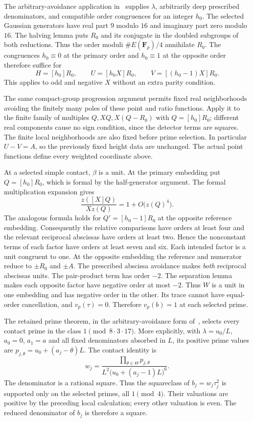 \documentclass[11pt,a4paper]{article}
\begin{document}
The arbitrary-avoidance application in~\cite[Section~2]{Primes}
supplies $\lambda$, arbitrarily deep prescribed denominators, and
compatible order congruences for an integer $h_0$.
The selected Gaussian generators have real part $9$ modulo $16$
and imaginary part zero modulo $16$. The halving lemma
\cite[Section~5]{Half} puts $R_0$ and its conjugate in the doubled
subgroups of both reductions. Thus the order moduli
$\#E(\mathbf F_p)/4$ annihilate $R_0$.
The congruences $h_0\equiv0$ at the primary order and
$h_0\equiv1$ at the opposite order therefore suffice for
\[
 H=[h_0]R_0,\qquad U=[h_0X]R_0,\qquad
 V=[(h_0-1)X]R_0.
\]
This applies to odd and negative $X$ without an extra parity condition.

The same compact-group progression argument permits fixed real
neighborhoods avoiding the finitely many poles of these point and
ratio functions. Apply it to the finite family of multiples
$Q,XQ,X(Q-R_0)$ with $Q=[h_0]R_0$; different real components cause
no sign condition, since the detector terms are squares.
The finite local neighborhoods are also fixed before prime selection.
In particular $U-V=A$, so the previously fixed height data are unchanged.
The actual point functions define every weighted coordinate above.

At a selected simple contact, $\beta$ is a unit. At the primary
embedding put $Q=[h_0]R_0$, which is formal by the half-generator
argument. The formal multiplication expansion gives
\[
             \frac{z([X]Q)}{X z(Q)}
                         =1+O\bigl(z(Q)^4\bigr).
\]
The analogous formula holds for $Q'=[h_0-1]R_0$ at the opposite
reference embedding. Consequently the relative comparisons have
orders at least four and the relevant reciprocal abscissas have
orders at least two.
Hence the nonconstant terms of each factor have orders at least
seven and six. Each intended factor is a unit congruent to one.
At the opposite embedding the reference and numerator reduce to
$\pm R_0$ and $\pm A$. The prescribed abscissa avoidance makes
\emph{both} reciprocal abscissas units. The pair-product term has
order $-2$. The separation lemma makes each opposite factor have
negative order at most $-2$. Thus $W$ is a unit in one embedding
and has negative order in the other. Its trace cannot have
equal-order cancellation, and $v_p(\tau)=0$.
Therefore $v_p(b)=1$ at each selected prime.

The retained prime theorem, in the arbitrary-avoidance form
of~\cite{Primes}, selects every contact prime in the
class $1\pmod{8\cdot3\cdot17}$. More explicitly, with
$\lambda=u_0/L$, $a_0=0$, $a_1=a$ and all fixed denominators
absorbed in $L$, its positive prime values are
$p_{j,\theta}=u_0+(a_j-\theta)L$. The contact identity is
\begin{equation}\label{eq:squareclass}
 w_j=
 \frac{\prod_{\theta\in\Theta}p_{j,\theta}}
      {L^2\bigl(u_0+(a_j-1)L\bigr)^6}.
\end{equation}
The denominator is a rational square. Thus the squareclass of
$b_j=w_j\tau_j^2$ is supported only on the selected primes, all
$1\pmod4$. Their valuations are positive by the preceding local
calculation; every other valuation is even. The reduced denominator
of $b_j$ is therefore a square.
\end{document}
